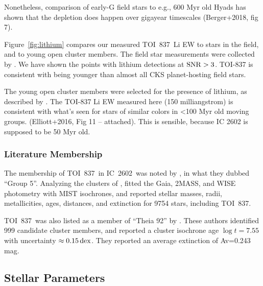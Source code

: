\documentclass[12pt,twocolumn,tighten]{aastex62}
\newcommand{\tn}{TOI~837} %
\newcommand{\cn}{IC~2602} %
\begin{document}
Nonetheless, comparison of early-G field stars to e.g., 600 Myr old
Hyads has shown that the depletion does happen over gigayear timescales
(Berger+2018, fig 7).

Figure~\ref{fig:lithium} compares our measured \tn\ Li EW 
to stars in the field, and to young open cluster members.
The field star measurements were collected by
\citet{berger_identifying_2018}.
We have shown the points with lithium detections at ${\rm SNR}>3$.
TOI-837 is consistent with being younger than almost all CKS
planet-hosting field stars.

The young open cluster members were selected for the presence of
lithium, as described by \citet{randich_gaiaeso_2018}.
The TOI-837 Li EW measured here (150 milliangstrom) is consistent
with what's seen for stars of similar colors in <100 Myr old moving
groups.
(Elliott+2016, Fig 11 -- attached).  This is sensible, because
IC 2602 is supposed to be 50 Myr old.



\subsubsection{Literature Membership}
The membership of \tn\ in \cn\ was noted by \citet{oh_comoving_2017},
in what they dubbed ``Group 5''.
Analyzing the clusters of \citet{oh_comoving_2017},
\citet{bochanski_fundamental_2018} fitted the Gaia, 2MASS, and
WISE photometry with MIST isochrones, and reported stellar masses,
radii, metallicities, ages, distances, and extinction for 9754 stars,
including \tn.
%


\tn\ was also listed as a member of ``Theia 92'' by
\citet{kounkel_untangling_2019}.
These authors identified 999 candidate cluster members, and
reported a cluster isochrone age $\log t = 7.55$ with uncertainty
$\approx 0.15\,{\rm dex}$.
They reported an average extinction of Av=0.243 mag.


\subsection{Stellar Parameters}
\end{document}
